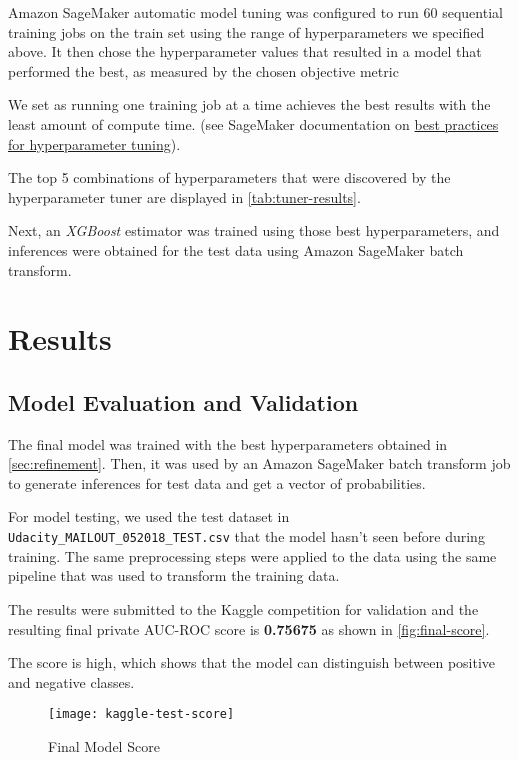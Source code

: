 \documentclass[a4paper]{article}
\begin{document}
{    Amazon SageMaker automatic model tuning was configured to run 60 sequential training jobs on the train set using the range of hyperparameters we specified above. It then chose the hyperparameter values that resulted in a model that performed the best, as measured by the chosen objective metric 

    We set  as running one training job at a time achieves the best results with the least amount of compute time. (see SageMaker documentation on \href{https://docs.aws.amazon.com/sagemaker/latest/dg/automatic-model-tuning-considerations.html}{best practices for hyperparameter tuning}).

    The top 5 combinations of hyperparameters that were discovered by the hyperparameter tuner are displayed in \autoref{tab:tuner-results}.
    

    Next, an \emph{XGBoost} estimator was trained using those best hyperparameters, and inferences were obtained for the test data using Amazon SageMaker batch transform.
    
    \section{Results}
    \subsection{Model Evaluation and Validation}
    \label{sec:model-eval-valid}
    The final model was trained with the best hyperparameters obtained in \autoref{sec:refinement}.
    Then, it was used by an Amazon SageMaker batch transform job to generate inferences for test data and get a vector of probabilities.

    For model testing, we used the test dataset in \texttt{Udacity\_MAILOUT\_052018\_TEST.csv} that the model hasn't seen before during training. The same preprocessing steps were applied to the data using the same pipeline that was used to transform the training data.

    The results were submitted to the Kaggle competition for validation and the resulting final private AUC-ROC score is \textbf{0.75675} as shown in \autoref{fig:final-score}.

    The score is high, which shows that the model can distinguish between positive and negative classes.

    \begin{figure}[H]
      \centering
      \caption{Final Model Score}
      \label{fig:final-score}
      \texttt{[image: kaggle-test-score]}
    \end{figure}


}
\end{document}
